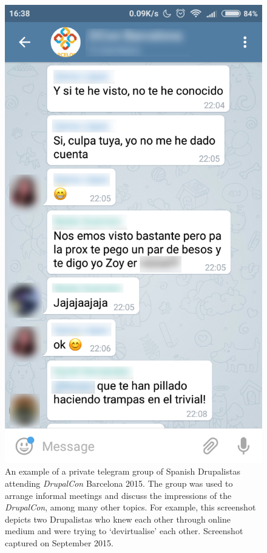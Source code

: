 \begin{figure}[H]
    \centering
    \includegraphics[scale=0.25]{img/tools/telegram_dcon.png}
    \caption[A private telegram group of Drupalistas]%
    {An example of a private telegram group of Spanish Drupalistas attending \textit{DrupalCon} Barcelona 2015. The group was used to arrange informal meetings and discuss the impressions of the \textit{DrupalCon}, among many other topics. For example, this screenshot depicts two Drupalistas who knew each other through online medium and were trying to `devirtualise' each other. Screenshot captured on  September 2015.}
    \label{telegram_interaction}
\end{figure}


